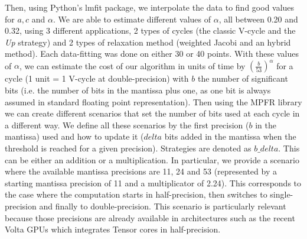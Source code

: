 Then, using Python's lmfit package, we interpolate the data to find good values
for $a,c$ and $\alpha$. We are able to estimate different values of $\alpha$,
all between 0.20 and 0.32, using 3 different applications, 2 types of cycles
(the classic V-cycle and the \emph{Up} strategy) and 2 types of relaxation
method (weighted Jacobi and an hybrid method).  Each data-fitting was done on
either 30 or 40 points.  With these values of $\alpha$, we can estimate the
cost of our algorithm in units of time by $\left(\frac{b}{53}\right)^\alpha$
for a cycle (1 unit = 1 V-cycle at double-precision) with $b$ the number of
significant bits (i.e. the number of bits in the mantissa plus one, as one bit
is always assumed in standard floating point representation). Then using the
MPFR library we can create different scenarios that set the number of bits used
at each cycle in a different way. We define all these scenarios by the first
precision ($b$ in the mantissa) used and how to update it ($delta$ bits added
in the mantissa when the threshold is reached for a given precision).
Strategies are denoted as $b\_delta$. This can be either an addition or a
multiplication. In particular, we provide a scenario where the available
mantissa precisions are 11, 24 and 53 (represented by a starting mantissa
precision of 11 and a multiplicator of 2.24). This corresponds to the case
where the computation starts in half-precision, then switches to
single-precision and finally to double-precision. This scenario is particularly
relevant because those precisions are already available in architectures such
as the recent Volta GPUs which integrates Tensor cores in half-precision.


